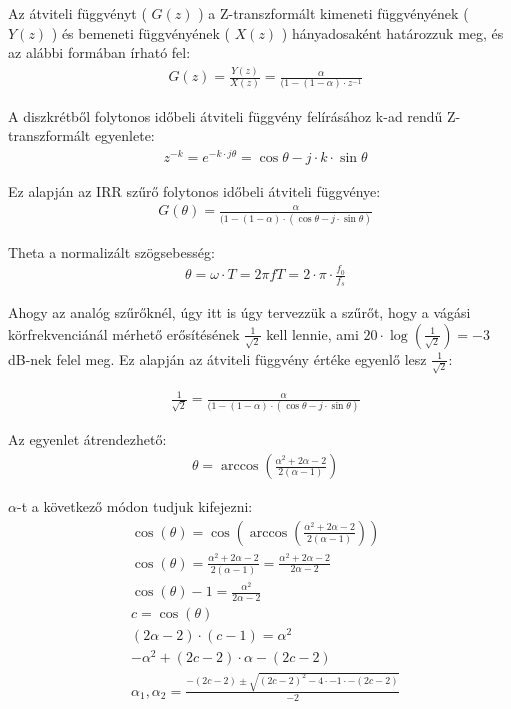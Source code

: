 \documentclass[a4paper,12pt]{article}
\newcommand\Pbracket[1]{\left(#1\right)}
\begin{document}
	Az átviteli függvényt ( $ G(z) $ ) a Z-transzformált kimeneti függvényének ( $ Y(z) $ )  és bemeneti függvényének ( $ X(z) $ ) hányadosaként határozzuk meg, és az alábbi formában írható fel:
	\begin{align}
		& G(z) = \frac{Y(z)}{X(z)} = \frac{\alpha}{(1 - (1-\alpha) \cdot z^{-1}} 
	\end{align}
	
	A diszkrétből folytonos időbeli átviteli függvény felírásához k-ad rendű Z-transzformált egyenlete:
	\begin{align}
		& z^{-k} = e^{-k \cdot j \theta} = \cos{\theta} - j \cdot k \cdot \sin{\theta}
	\end{align}
	
	Ez alapján az IRR szűrő folytonos időbeli átviteli függvénye:
	\begin{align}
		& G(\theta) = \frac{\alpha}{ (1 - (1-\alpha) \cdot ( \cos{\theta} - j \cdot \sin{\theta} ) }
	\end{align}
	
	Theta a normalizált szögsebesség:
	\begin{align}
		& \theta = \omega \cdot T = 2 \pi f T = 2 \cdot \pi \cdot \frac{f_0}{f_s} 
	\end{align}
	
	Ahogy az analóg szűrőknél, úgy itt is úgy tervezzük a szűrőt, hogy a vágási körfrekvenciánál mérhető erősítésének $ \frac{1}{\sqrt{2}} $ kell lennie, ami  $ 20 \cdot \log(\frac{1}{\sqrt{2}}) = -3 $ dB-nek felel meg. Ez alapján az átviteli függvény értéke egyenlő lesz $ \frac{1}{\sqrt{2}} $:
	
	\begin{align}
		& \frac{1}{\sqrt{2}} = \frac{\alpha}{ (1 - (1-\alpha) \cdot ( \cos{\theta} - j \cdot \sin{\theta} ) }
	\end{align}
	
	Az egyenlet átrendezhető:
	\begin{align}
		& \theta = \arccos\Pbracket{\frac{\alpha^2 + 2\alpha - 2}{ 2(\alpha -1 )}}
	\end{align}
	
	$\alpha$-t a következő módon tudjuk kifejezni:
	\begin{align}
		& \cos(\theta) = \cos\Pbracket {\arccos\Pbracket{\frac{\alpha^2 + 2\alpha - 2}{ 2(\alpha -1 )}}} \\
		& \cos(\theta) = \frac{\alpha^2 + 2\alpha - 2}{ 2(\alpha -1 )} = \frac{\alpha^2 + 2\alpha - 2}{ 2\alpha - 2} \\
		& \cos(\theta) - 1 = \frac{\alpha^2 }{ 2\alpha - 2 } \\
		& c = \cos(\theta) \\
		& (2\alpha -2) \cdot (c - 1) = \alpha^2 \\
		& -\alpha^2 + (2c-2) \cdot \alpha -(2c-2) \\
		& \alpha_1,\alpha_2 =\frac{-(2c-2) \pm \sqrt{(2c-2)^2 - 4 \cdot -1 \cdot -(2c-2)}}{-2}	
	\end{align}
	
\end{document}
